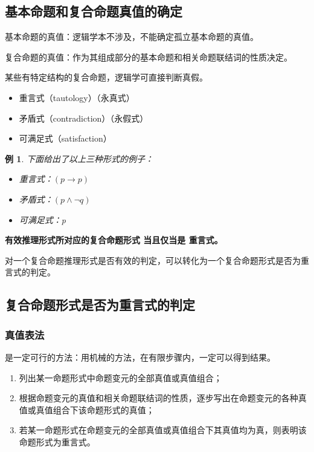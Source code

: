 \documentclass[12pt,onecolumn,a4paper]{book}
\newtheorem*{example}{例}
\numberwithin{table}{subsection}
\numberwithin{equation}{subsection}
\begin{document}
\subsection{基本命题和复合命题真值的确定}

基本命题的真值：逻辑学本不涉及，不能确定孤立基本命题的真值。

复合命题的真值：作为其组成部分的基本命题和相关命题联结词的性质决定。

某些有特定结构的复合命题，逻辑学可直接判断真假。

\begin{itemize}[itemsep=0pt,parsep=0pt]
    \item 重言式（tautology）（永真式）\label{chongyanshi}
    \item 矛盾式（contradiction）（永假式）
    \item 可满足式（satisfaction）
\end{itemize}

\begin{example}
    下面给出了以上三种形式的例子：
    \begin{itemize}[itemsep=0pt,parsep=0pt]
        \item 重言式：$(p \rightarrow p)$
        \item 矛盾式：$(p \land \lnot q)$
        \item 可满足式：p
    \end{itemize}
\end{example}


\textbf{有效推理形式所对应的复合命题形式 当且仅当是 重言式。}

对一个复合命题推理形式是否有效的判定，可以转化为一个复合命题形式是否为重言式的判定。

\subsection{复合命题形式是否为重言式的判定}

\subsubsection{真值表法}

是一定可行的方法：用机械的方法，在有限步骤内，一定可以得到结果。

\begin{enumerate}[itemsep=0pt,parsep=0pt]
    \item 列出某一命题形式中命题变元的全部真值或真值组合；
    \item 根据命题变元的真值和相关命题联结词的性质，逐步写出在命题变元的各种真值或真值组合下该命题形式的真值；
    \item 若某一命题形式在命题变元的全部真值或真值组合下其真值均为真，则表明该命题形式为重言式。
\end{enumerate}
\end{document}
